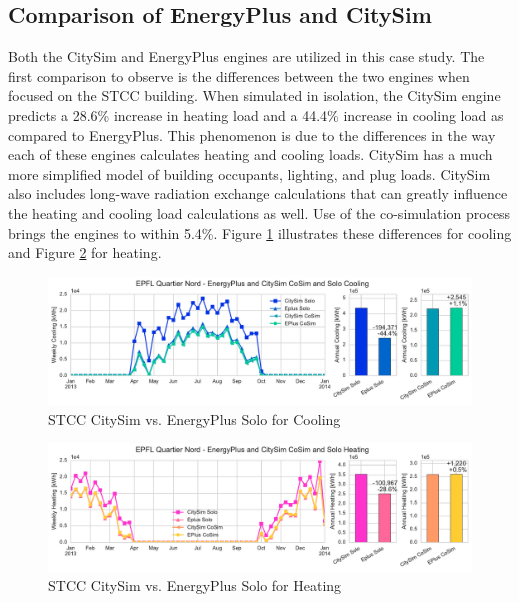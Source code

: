 \documentclass{tBPS2e}
\theoremstyle{plain}
\theoremstyle{definition}
\theoremstyle{remark}
\begin{document}
\subsection{Comparison of EnergyPlus and CitySim}

Both the CitySim and EnergyPlus engines are utilized in this case study. The
first comparison to observe is the differences between the two engines when
focused on the STCC building. When simulated in isolation, the
CitySim engine predicts a 28.6\% increase in heating load and a 44.4\%
increase in cooling load as compared to EnergyPlus. This phenomenon is due to
the differences in the way each of these engines calculates heating and
cooling loads. CitySim has a much more simplified model of building occupants,
lighting, and plug loads. CitySim also includes long-wave radiation exchange calculations
that can greatly influence the heating and cooling load calculations as well.
 Use of the co-simulation process brings the engines to within
5.4\%. Figure \ref{fig:qn_eplusvscitysim_cooling} illustrates these
differences for cooling and Figure \ref{fig:qn_eplusvscitysim_heating} for
heating.

\begin{figure}[H]
\centering
\includegraphics[scale=0.55]{figures/QN_Cooling}
\caption{STCC CitySim vs. EnergyPlus Solo for Cooling}
\label{fig:qn_eplusvscitysim_cooling}
\end{figure}

\begin{figure}[H]
\centering
\includegraphics[scale=0.55]{figures/QN_Heating.pdf}
\caption{STCC CitySim vs. EnergyPlus Solo for Heating}
\label{fig:qn_eplusvscitysim_heating}
\end{figure}
\end{document}
